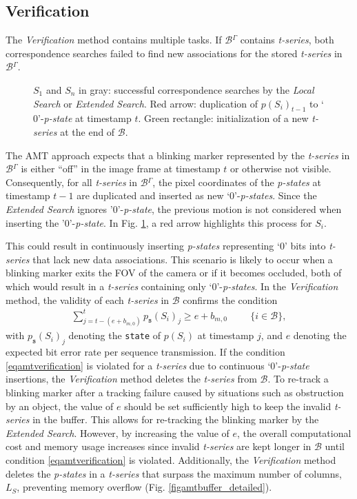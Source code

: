 \documentclass[lettersize,preprint]{elsarticle}
\newcommand{\B}{$\mathcal{B}$}
\newcommand{\ps}{\emph{p-state}}
\newcommand{\ts}{\emph{t-series}}
\begin{document}
\subsection{Verification}\label{subsecamtverification}
The \emph{Verification} method contains multiple tasks.
If \B{}$^\Gamma$ contains \ts{}, both correspondence searches failed to find new associations for the stored \ts{} in \B{}$^\Gamma$. 
\begin{figure}[!b]
  \centering
  \vspace{-5pt}
  \scalebox{0.45}{}
  \caption{$S_1$ and $S_n$ in gray: successful correspondence searches by the \emph{Local Search} or \emph{Extended Search}. Red arrow: duplication of $p(S_i)_{t-1}$ to `$0$'-\ps{} at timestamp $t$. Green rectangle: initialization of a new \ts{} at the end of \B{}.} 
  \label{fig:verification}
\end{figure}
The \gls{AMT} approach expects that a blinking marker represented by the \ts{} in \B{}$^\Gamma$ is either \enquote{off} in the image frame at timestamp $t$ or otherwise not visible.
Consequently, for all \ts{} in \B{}$^\Gamma$, the pixel coordinates of the \emph{p-states} at timestamp $t-1$ are duplicated and inserted as new `$0$'-\emph{p-states}.
Since the \emph{Extended Search} ignores '0'-\ps{}, the previous motion is not considered when inserting the '0'-\ps{}.
In Fig. \ref{fig:verification}, a red arrow highlights this process for $S_i$.

This could result in continuously inserting \emph{p-states} representing `$0$' bits into \ts{} that lack new data associations.
This scenario is likely to occur when a blinking marker exits the \gls{FOV} of the camera or if it becomes occluded, both of which would result in a \ts{} containing only `0'-\emph{p-states}.
In the \emph{Verification} method, the validity of each \ts{} in \B{} confirms the condition
\begin{align}
  \sum_{j=t-(e+b_{m,0})}^{t} p_\texttt{s}(S_i)_j \geq e+b_{m,0}\label{eqamtverification} \hspace{1cm} \{i\in \mathcal{B}\},
\end{align}
with $p_\texttt{s}(S_i)_j$ denoting the \texttt{state} of $p(S_i)$ at timestamp $j$, and $e$ denoting the expected bit error rate per sequence transmission. 
If the condition \eqref{eqamtverification} is violated for a \ts{} due to continuous `$0$'-\ps{} insertions, the \emph{Verification} method deletes the \ts{} from \B{}.
To re-track a blinking marker after a tracking failure caused by situations such as obstruction by an object, the value of $e$ should be set sufficiently high to keep the invalid \emph{t-series} in the buffer.
This allows for re-tracking the blinking marker by the \emph{Extended Search}.
However, by increasing the value of $e$, the overall computational cost and memory usage increases since invalid \emph{t-series} are kept longer in \B{} until condition \eqref{eqamtverification} is violated.
Additionally, the \emph{Verification} method deletes the \emph{p-states} in a \ts{} that surpass the maximum number of columns, $L_S$, preventing memory overflow (Fig. \ref{figamtbuffer_detailed}).
\end{document}
